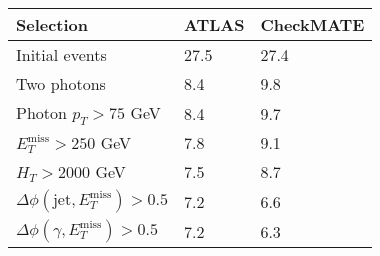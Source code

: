 \documentclass[12pt,fleqn]{article}
\begin{document}
\begin{enumerate}
\begin{table}[h!] 
 \renewcommand*{\arraystretch}{1.2}
 \begin{tabular}{l|p{3cm}|p{3cm}} \toprule
  Selection                                                                       & ATLAS    & CheckMATE       \\ \midrule
  Initial events                                                                  & 27.5     &  27.4          \\
  Two photons                                                                     &  8.4     &   9.8 \\
  Photon $p_T>75$ GeV                                                             &  8.4     &   9.7 \\
  $E_T^\mathrm{miss} > 250$ GeV                                                   &  7.8     &   9.1 \\
  $H_T > 2000$ GeV                                                                &  7.5     &   8.7  \\ 
  $\Delta\phi(\mathrm{jet},E_T^\mathrm{miss}) > 0.5$                              &  7.2     &   6.6 \\   
  $\Delta\phi(\gamma,E_T^\mathrm{miss}) > 0.5$                                    &  7.2     &   6.3  \\ \bottomrule  
 \end{tabular}
\end{table}  
 

\end{enumerate}
\end{document}
